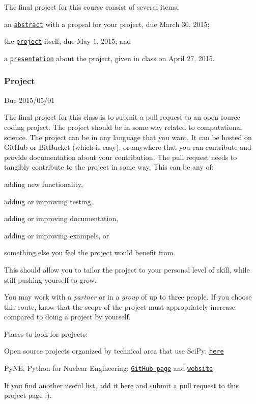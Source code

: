 The final project for this course consist of several items\+:


\begin{DoxyItemize}
\item an \href{#abstract}{\tt abstract} with a propsal for your project, due March 30, 2015;
\item the \href{#project}{\tt project} itself, due May 1, 2015; and
\item a \href{#presentation}{\tt presentation} about the project, given in class on April 27, 2015. 

 \subsubsection*{Project}
\end{DoxyItemize}

Due 2015/05/01

The final project for this class is to submit a pull request to an open source coding project. The project should be in some way related to computational science. The project can be in any language that you want. It can be hosted on Git\+Hub or Bit\+Bucket (which is easy), or anywhere that you can contribute and provide documentation about your contribution. The pull request needs to tangibly contribute to the project in some way. This can be any of\+:


\begin{DoxyItemize}
\item adding new functionality,
\item adding or improving testing,
\item adding or improving documentation,
\item adding or improving exampels, or
\item something else you feel the project would benefit from.
\end{DoxyItemize}

This should allow you to tailor the project to your personal level of skill, while still pushing yourself to grow.

You may work with a {\itshape partner} or in a {\itshape group} of up to three people. If you choose this route, know that the scope of the project must appropriately increase compared to doing a project by yourself.

Places to look for projects\+:


\begin{DoxyItemize}
\item Open source projects organized by technical area that use Sci\+Py\+: \href{http://www.scipy.org/topical-software.html#topic-guides-organized-by-scientific-field}{\tt here}
\item Py\+N\+E, Python for Nuclear Engineering\+: \href{https://github.com/pyne/pyne}{\tt Git\+Hub page} and \href{http://pyne.io/}{\tt website}
\item If you find another useful list, add it here and submit a pull request to this project page \+:).
\end{DoxyItemize}

